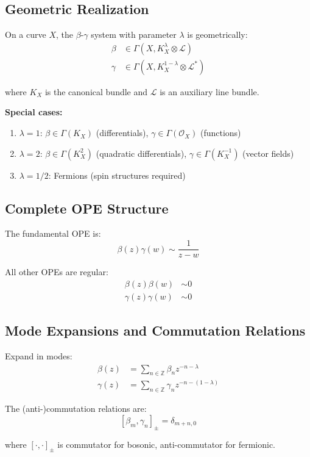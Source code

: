 \subsection{Geometric Realization}

\begin{construction}
\label{const:geometric-beta-gamma}
On a curve $X$, the $\beta$-$\gamma$ system with parameter $\lambda$ is geometrically:
\begin{align}
\beta &\in \Gamma(X, K_X^\lambda \otimes \mathcal{L})\\
\gamma &\in \Gamma(X, K_X^{1-\lambda} \otimes \mathcal{L}^*)
\end{align}

where $K_X$ is the canonical bundle and $\mathcal{L}$ is an auxiliary line bundle.

\textbf{Special cases:}
\begin{enumerate}
\item $\lambda = 1$: $\beta \in \Gamma(K_X)$ (differentials), $\gamma \in \Gamma(\mathcal{O}_X)$ (functions)
\item $\lambda = 2$: $\beta \in \Gamma(K_X^2)$ (quadratic differentials), $\gamma \in \Gamma(K_X^{-1})$ (vector fields)
\item $\lambda = 1/2$: Fermions (spin structures required)
\end{enumerate}
\end{construction}

\subsection{Complete OPE Structure}

\begin{definition}
\label{def:beta-gamma-ope-complete}
The fundamental OPE is:
$$\beta(z)\gamma(w) \sim \frac{1}{z-w}$$

All other OPEs are regular:
\begin{align}
\beta(z)\beta(w) &\sim 0\\
\gamma(z)\gamma(w) &\sim 0
\end{align}
\end{definition}

\subsection{Mode Expansions and Commutation Relations}

\begin{proposition}
\label{prop:beta-gamma-modes}
Expand in modes:
\begin{align}
\beta(z) &= \sum_{n \in \mathbb{Z}} \beta_n z^{-n-\lambda}\\
\gamma(z) &= \sum_{n \in \mathbb{Z}} \gamma_n z^{-n-(1-\lambda)}
\end{align}

The (anti-)commutation relations are:
$$[\beta_m, \gamma_n]_\pm = \delta_{m+n,0}$$

where $[\cdot,\cdot]_\pm$ is commutator for bosonic, anti-commutator for fermionic.
\end{proposition}

